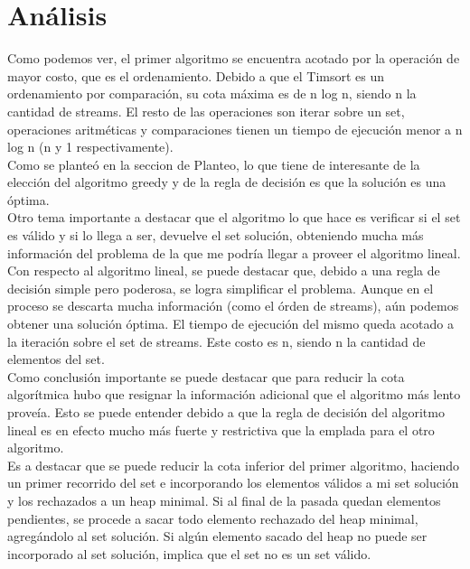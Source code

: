 \documentclass[12pt]{article}
\begin{document}
\section{An\'alisis}\label{analisis}
Como podemos ver, el primer algoritmo se encuentra acotado por la operaci\'on de mayor costo, que es el ordenamiento.
Debido a que el Timsort es un ordenamiento por comparaci\'on, su cota m\'axima es de n log n, siendo n la cantidad de streams. El resto de las operaciones son iterar sobre un set, operaciones aritm\'eticas y comparaciones tienen un tiempo de ejecuci\'on menor a n log n (n y 1 respectivamente).\\
Como se plante\'o en la seccion de Planteo, lo que tiene de interesante de la elecci\'on del algoritmo greedy y de la regla de decisi\'on es que la soluci\'on es una \'optima.\\
Otro tema importante a destacar que el algoritmo lo que hace es verificar si el set es v\'alido y si lo llega a ser, devuelve el set soluci\'on, obteniendo mucha m\'as informaci\'on del problema de la que me podr\'ia llegar a proveer el algoritmo lineal.\\
Con respecto al algoritmo lineal, se puede destacar que, debido a una regla de decisi\'on simple pero poderosa, se logra simplificar el problema. Aunque en el proceso se descarta mucha informaci\'on (como el \'orden de streams), a\'un podemos obtener una soluci\'on \'optima. El tiempo de ejecuci\'on del mismo queda acotado a la iteraci\'on sobre el set de streams. Este costo es n, siendo n la cantidad de elementos del set.\\
Como conclusi\'on importante se puede destacar que para reducir la cota algor\'itmica hubo que resignar la informaci\'on adicional que el algoritmo m\'as lento prove\'ia. Esto se puede entender debido a que la regla de decisi\'on del algoritmo lineal es en efecto mucho m\'as fuerte y restrictiva que la emplada para el otro algoritmo.\\
Es a destacar que se puede reducir la cota inferior del primer algoritmo, haciendo un primer recorrido del set e incorporando los elementos v\'alidos a mi set soluci\'on y los rechazados a un heap minimal. Si al final de la pasada quedan elementos pendientes, se procede a sacar todo elemento rechazado del heap minimal, agreg\'andolo al set soluci\'on. Si alg\'un elemento sacado del heap no puede ser incorporado al set soluci\'on, implica que el set no es un set v\'alido.

\newpage
\end{document}
